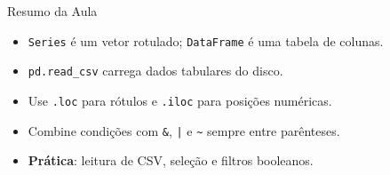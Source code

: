 \documentclass[aspectratio=169, 10pt]{beamer}
\begin{document}
\begin{frame}{Resumo da Aula}
  \begin{itemize}
    \item \texttt{Series} é um vetor rotulado; \texttt{DataFrame} é uma tabela de colunas.
    \item \texttt{pd.read\_csv} carrega dados tabulares do disco.
    \item Use \texttt{.loc} para rótulos e \texttt{.iloc} para posições numéricas.
    \item Combine condições com \texttt{\&}, \texttt{|} e \texttt{\textasciitilde} sempre entre parênteses.
    \item \textbf{Prática}: leitura de CSV, seleção e filtros booleanos.
  \end{itemize}
\end{frame}
\end{document}
